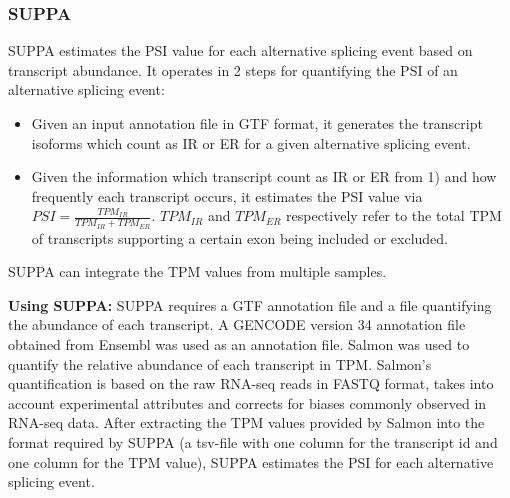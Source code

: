 \subsubsection{SUPPA}\label{subsubsec:suppa}
SUPPA \cite{suppa2} estimates the PSI value for each alternative splicing event based on transcript abundance. It operates in 2 steps for quantifying the PSI of an alternative splicing event:
\begin{itemize}
	\item Given an input annotation file in GTF format, it generates the transcript isoforms which count as IR or ER for a given alternative splicing event.
	\item Given the information which transcript count as IR or ER from 1) and how frequently each transcript occurs, it estimates the PSI value via $PSI = \frac{TPM_{IR}}{TPM_{IR} + TPM_{ER}}$. $TPM_{IR}$ and $TPM_{ER}$ respectively refer to the total TPM of transcripts supporting a certain exon being included or excluded. 
\end{itemize}
SUPPA can integrate the TPM values from multiple samples.


\textbf{Using SUPPA:}
SUPPA requires a GTF annotation file and a file quantifying the abundance of each transcript. A GENCODE version 34 annotation file obtained from Ensembl was used as an annotation file. Salmon \cite{salmon} was used to quantify the relative abundance of each transcript in TPM. Salmon's quantification is based on the raw RNA-seq reads in FASTQ format, takes into account experimental attributes and corrects for biases commonly observed in RNA-seq data. After extracting the TPM values provided by Salmon into the format required by SUPPA (a tsv-file with one column for the transcript id and one column for the TPM value), SUPPA estimates the PSI for each alternative splicing event.

